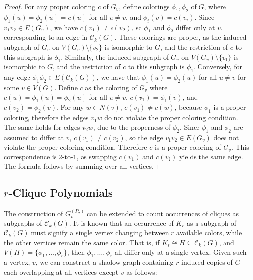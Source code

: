 \documentclass[12pt,reqno,dvipsnames]{amsart}
\theoremstyle{definition}
\begin{document}
\begin{proof}
For any proper coloring $c$ of $G_v$, define colorings $\phi_1, \phi_2$ of $G$, where $\phi_1(u)=\phi_2(u)=c(u)$ for all $u\neq v$, and $\phi_i(v)=c(v_i)$. Since $v_1v_2 \in E(G_v)$, we have $c(v_1) \neq c(v_2)$, so $\phi_1$ and $\phi_2$ differ only at $v$, corresponding to an edge in $\mathcal{C}_k(G)$. These colorings are proper, as the induced subgraph of $G_v$ on $V(G_v)\setminus \{v_2\}$ is isomorphic to $G$, and the restriction of $c$ to this subgraph is $\phi_1$. Similarly, the induced subgraph of $G_v$ on $V(G_v)\setminus \{v_1\}$ is isomorphic to $G$, and the restriction of $c$ to this subgraph is $\phi_1$. Conversely, for any edge $\phi_1\phi_2\in E(\mathcal{C}_k(G))$, we have that $\phi_1(u)=\phi_2(u)$ for all $u\ne v$ for some $v\in V(G)$. Define $c$ as the coloring of $G_v$ where $c(u)=\phi_1(u)=\phi_2(u)$ for all $u\ne v$, $c(v_1)=\phi_1(v)$, and $c(v_2)=\phi_2(v)$. For any $w\in N(v)$, $c(v_1)\ne c(w)$, because $\phi_1$ is a proper coloring, therefore the edges $v_1w$ do not violate the proper coloring condition. The same holds for edges $v_2w$, due to the properness of $\phi_2$. Since $\phi_1$ and $\phi_2$ are assumed to differ at $v$, $c(v_1)\ne c(v_2)$, so the edge $v_1v_2\in E(G_v)$ does not violate the proper coloring condition. Therefore $c$ is a proper coloring of $G_v$. This correspondence is 2-to-1, as swapping $c(v_1)$ and $c(v_2)$ yields the same edge. The formula follows by summing over all vertices.
\end{proof}

\subsection{\texorpdfstring{$r$}{r}-Clique Polynomials}
The construction of $G_v^{(P_2)}$ can be extended to count occurrences of cliques as subgraphs of $\mathcal{C}_k(G)$. It is known that an occurrence of $K_r$ as a subgraph of $\mathcal{C}_k(G)$ must signify a single vertex changing between $r$ available colors, while the other vertices remain the same color. That is, if $K_r\cong H \subseteq \mathcal{C}_k(G)$, and $V(H)=\{\phi_1,\dots,\phi_r\}$, then $\phi_1,\dots,\phi_r$ all differ only at a single vertex. Given such a vertex, $v$, we can construct a shadow graph containing $r$ induced copies of $G$ each overlapping at all vertices except $v$ as follows:
\end{document}
